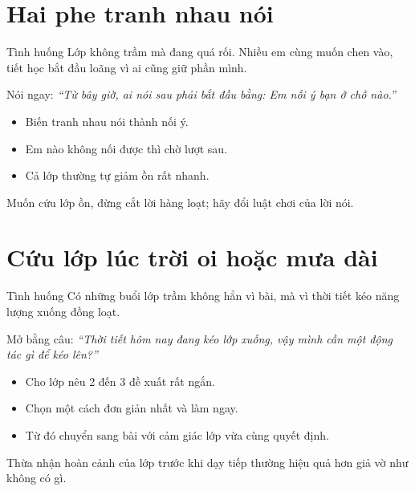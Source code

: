 \section{Hai phe tranh nhau nói}
\begin{tinhhuong}{Tình huống}
Lớp không trầm mà đang quá rối. Nhiều em cùng muốn chen vào, tiết học bắt đầu loãng vì ai cũng giữ phần mình.
\end{tinhhuong}
\begin{goiydungngay}
Nói ngay: \textit{``Từ bây giờ, ai nói sau phải bắt đầu bằng: Em nối ý bạn ở chỗ nào.''}
\begin{itemize}
\item Biến tranh nhau nói thành nối ý.
\item Em nào không nối được thì chờ lượt sau.
\item Cả lớp thường tự giảm ồn rất nhanh.
\end{itemize}
\end{goiydungngay}
\begin{cauchot}
Muốn cứu lớp ồn, đừng cắt lời hàng loạt; hãy đổi luật chơi của lời nói.
\end{cauchot}
\ngancach

\section{Cứu lớp lúc trời oi hoặc mưa dài}
\begin{tinhhuong}{Tình huống}
Có những buổi lớp trầm không hẳn vì bài, mà vì thời tiết kéo năng lượng xuống đồng loạt.
\end{tinhhuong}
\begin{goiydungngay}
Mở bằng câu: \textit{``Thời tiết hôm nay đang kéo lớp xuống, vậy mình cần một động tác gì để kéo lên?''}
\begin{itemize}
\item Cho lớp nêu 2 đến 3 đề xuất rất ngắn.
\item Chọn một cách đơn giản nhất và làm ngay.
\item Từ đó chuyển sang bài với cảm giác lớp vừa cùng quyết định.
\end{itemize}
\end{goiydungngay}
\begin{cauchot}
Thừa nhận hoàn cảnh của lớp trước khi dạy tiếp thường hiệu quả hơn giả vờ như không có gì.
\end{cauchot}
\ngancach

